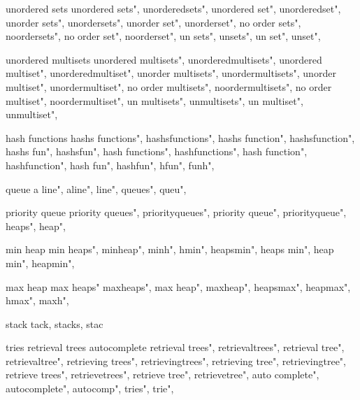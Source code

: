          unordered sets
        unordered sets", 
        unorderedsets", 
        unordered set", 
        unorderedset", 
        unorder sets", 
        unordersets", 
        unorder set", 
        unorderset", 
        no order sets", 
        noordersets", 
        no order set", 
        noorderset", 
        un sets", 
        unsets", 
        un set", 
        unset", 
        
         unordered multisets
        unordered multisets", 
        unorderedmultisets", 
        unordered multiset", 
        unorderedmultiset", 
        unorder multisets", 
        unordermultisets", 
        unorder multiset", 
        unordermultiset", 
        no order multisets", 
        noordermultisets", 
        no order multiset", 
        noordermultiset", 
        un multisets", 
        unmultisets", 
        un multiset", 
        unmultiset", 
        
         hash functions
        hashs functions",  
        hashsfunctions",  
        hashs function",  
        hashsfunction",  
        hashs fun",  
        hashsfun",  
        hash functions",  
        hashfunctions",  
        hash function",  
        hashfunction",  
        hash fun",  
        hashfun",  
        hfun",  
        funh",  
        
         queue 
        a line",
        aline",
        line",
        queues",
        queu",
        
         priority queue 
        priority queues",  
        priorityqueues",  
        priority queue",  
        priorityqueue",  
        heaps",  
        heap",  
        
         min heap 
        min heaps",
        minheap", 
        minh", 
        hmin",
        heapsmin",
        heaps min",
        heap min",
        heapmin",
        
         max heap
        max heaps"
        maxheaps",
        max heap",
        maxheap", 
        heapsmax",
        heapmax", 
        hmax",
        maxh",
        
         stack
        tack, stacks, stac
        
         tries retrieval trees autocomplete 
        retrieval trees",  
        retrievaltrees",  
        retrieval tree",  
        retrievaltree",  
        retrieving trees",  
        retrievingtrees",  
        retrieving tree",  
        retrievingtree",  
        retrieve trees",  
        retrievetrees",  
        retrieve tree",  
        retrievetree",  
        auto complete",  
        autocomplete",  
        autocomp",  
        tries",  
        trie",  
        
